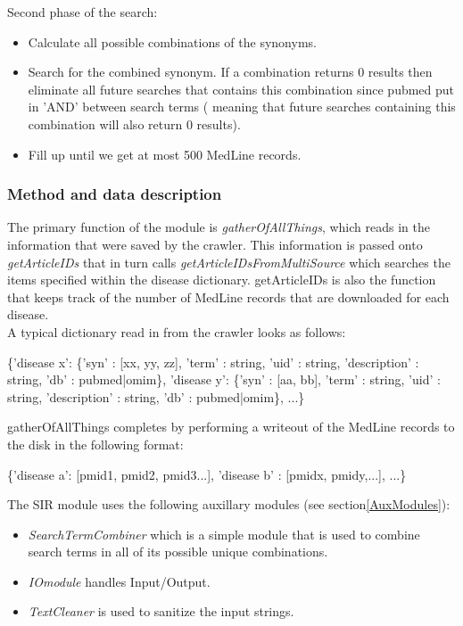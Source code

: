 Second phase of the search:
\begin{itemize}

\item Calculate all possible combinations of the synonyms.

\item Search for the combined synonym. If a combination returns 0 results then eliminate all future searches that contains this combination since pubmed put in 'AND' between search terms ( meaning that future searches containing this combination will also return 0 results).

\item Fill up until we get at most 500 MedLine records.

\end{itemize}

\subsubsection{Method and data description}
The primary function of the module is \textit{gatherOfAllThings},
which reads in the information that were saved by the crawler. This
information is passed onto \textit{getArticleIDs} that in turn calls
\textit{getArticleIDsFromMultiSource} which searches the items
specified within the disease dictionary. getArticleIDs is also the
function that keeps track of the number of MedLine records that are
downloaded for each disease.\\

A typical dictionary read in from the crawler looks as follows:

\begin{center}
{\small
\{'disease x': \{'syn' : [xx, yy, zz], 'term' : string, 'uid' : string,
    'description' : string, 'db' : pubmed|omim\}, 'disease y': \{'syn' :
    [aa, bb], 'term' : string, 'uid' : string, 'description' : string,
    'db' : pubmed|omim\}, ...\}
}
\end{center}

gatherOfAllThings completes by performing a writeout of the MedLine
records to the disk in the following format:

\begin{center}
{\small
\{'disease a': [pmid1, pmid2, pmid3...], 'disease b' : [pmidx,
    pmidy,...], ...\}
}
\end{center}

The SIR module uses the following auxillary modules (see
section\ref{AuxModules}):
\begin{itemize}
  \item \textit{SearchTermCombiner} which is a simple module that is used to
combine search terms in all of its possible unique combinations.
  \item \textit{IOmodule} handles Input/Output.
  \item \textit{TextCleaner} is used to sanitize the input strings.
\end{itemize}

